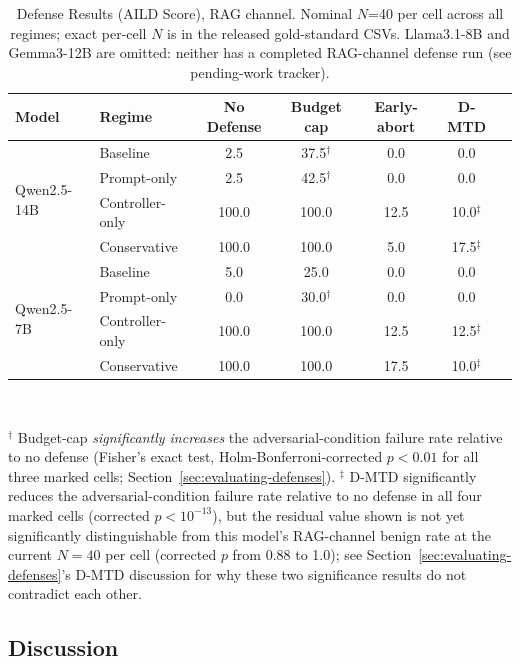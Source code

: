\documentclass[conference]{IEEEtran}
\begin{document}
\begin{table}[!t]
\centering
\caption{Defense Results (AILD Score), RAG channel. Nominal $N$=40 per cell across all regimes; exact per-cell $N$ is in the released gold-standard CSVs. Llama3.1-8B and Gemma3-12B are omitted: neither has a completed RAG-channel defense run (see pending-work tracker).}
\label{tab:defense-results-rag}
\scriptsize
\setlength{\tabcolsep}{4pt}
\begin{tabular}{llccccc}
\toprule
\textbf{Model} & \textbf{Regime} & \textbf{No Defense} & \textbf{Budget cap} & \textbf{Early-abort} & \textbf{D-MTD} \\
\midrule
\multirow{4}{*}{Qwen2.5-14B} & Baseline & 2.5 & 37.5$^\dagger$ & 0.0 & 0.0 \\
& Prompt-only & 2.5 & 42.5$^\dagger$ & 0.0 & 0.0 \\
& Controller-only & 100.0 & 100.0 & 12.5 & 10.0$^\ddagger$ \\
& Conservative & 100.0 & 100.0 & 5.0 & 17.5$^\ddagger$ \\
\midrule
\multirow{4}{*}{Qwen2.5-7B} & Baseline & 5.0 & 25.0 & 0.0 & 0.0 \\
& Prompt-only & 0.0 & 30.0$^\dagger$ & 0.0 & 0.0 \\
& Controller-only & 100.0 & 100.0 & 12.5 & 12.5$^\ddagger$ \\
& Conservative & 100.0 & 100.0 & 17.5 & 10.0$^\ddagger$ \\
\bottomrule
\end{tabular}
\\[2pt]
\raggedright\footnotesize $^\dagger$ Budget-cap \emph{significantly increases} the adversarial-condition failure rate relative to no defense (Fisher's exact test, Holm-Bonferroni-corrected $p<0.01$ for all three marked cells; Section~\ref{sec:evaluating-defenses}). \quad $^\ddagger$ D-MTD significantly reduces the adversarial-condition failure rate relative to no defense in all four marked cells (corrected $p<10^{-13}$), but the residual value shown is not yet significantly distinguishable from this model's RAG-channel benign rate at the current $N=40$ per cell (corrected $p$ from 0.88 to 1.0); see Section~\ref{sec:evaluating-defenses}'s D-MTD discussion for why these two significance results do not contradict each other.
\end{table}
%




\subsection{Discussion}
\end{document}

